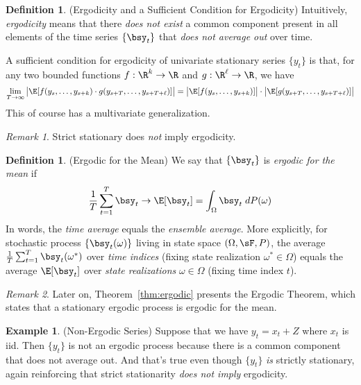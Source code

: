 \documentclass[12pt]{article}
\theoremstyle{plain}
\theoremstyle{definition}
\newtheorem{defn}[thm]{Definition}
\newtheorem{ex}[thm]{Example}
\theoremstyle{remark}
\newtheorem*{rmk}{Remark}
\newcommand{\ra}{\rightarrow}
\newcommand{\sumtT}{\sum^T_{t=1}}
\begin{document}
\begin{defn}(Ergodicity and a Sufficient Condition for Ergodicity)
Intuitively, \emph{ergodicity} means that there \emph{does not exist} a
common component present in all elements of the time series $\{\bsy_t\}$
that \emph{does not average out} over time.

A sufficient condition for ergodicity of univariate stationary series
$\{y_t\}$ is that, for any two bounded functions $f:\R^k\ra \R$ and
$g:\R^\ell\ra\R$, we have
\begin{align*}
  \lim_{T\ra\infty}
  \big|
  \E[
    f(y_s,\ldots,y_{s+k})
    \cdot
    g(y_{s+T},\ldots,y_{s+T+\ell})
  ]
  \big|
  =
  \big|
  \E[
    f(y_s,\ldots,y_{s+k})
  ]\big|
    \cdot
  \big|
  \E[
  g(y_{s+T},\ldots,y_{s+T+\ell})]
  \big|
\end{align*}
This of course has a multivariate generalization.
\end{defn}
\begin{rmk}
Strict stationary does \emph{not} imply ergodicity.
\end{rmk}

\begin{defn}(Ergodic for the Mean)
We say that $\{\bsy_t\}$ is \emph{ergodic for the mean} if
\begin{align*}
  \frac{1}{T}\sum^T_{t=1}\bsy_t \ra \E[\bsy_t]
  =\int_\Omega \bsy_t \; dP(\omega)
\end{align*}
In words, the \emph{time average} equals the \emph{ensemble average}.
More explicitly, for stochastic process $\{\bsy_t(\omega)\}$ living in
state space $(\Omega,\sF,P)$, the average $\frac{1}{T}\sumtT
\bsy_t(\omega^*)$ over \emph{time indices} (fixing state realization
$\omega^*\in\Omega$) equals the average $\E[\bsy_t]$ over
\emph{state realizations} $\omega\in\Omega$ (fixing time index $t$).
\end{defn}
\begin{rmk}
Later on, Theorem~\ref{thm:ergodic} presents the Ergodic Theorem, which
states that a stationary ergodic process is ergodic for the mean.
\end{rmk}

\begin{ex}(Non-Ergodic Series)
Suppose that we have $y_t=x_t+Z$ where $x_t$ is iid. Then $\{y_t\}$ is
not an ergodic process because there is a common component that does not
average out. And that's true even though $\{y_t\}$ \emph{is} strictly
stationary, again reinforcing that strict stationarity
\emph{does not imply} ergodicity.
\end{ex}
\end{document}
